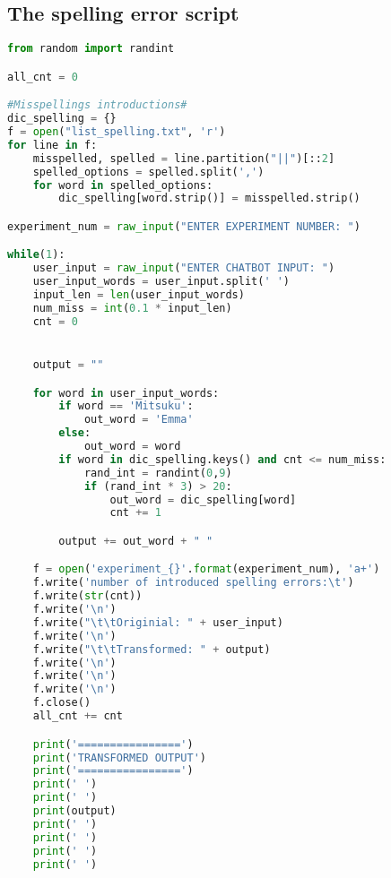 \subsection{The spelling error script}

\begin{lstlisting}[language=Python]
from random import randint

all_cnt = 0

#Misspellings introductions#
dic_spelling = {}
f = open("list_spelling.txt", 'r')
for line in f:
	misspelled, spelled = line.partition("||")[::2]
	spelled_options = spelled.split(',')
	for word in spelled_options:
		dic_spelling[word.strip()] = misspelled.strip()

experiment_num = raw_input("ENTER EXPERIMENT NUMBER: ")

while(1):
	user_input = raw_input("ENTER CHATBOT INPUT: ")
	user_input_words = user_input.split(' ')
	input_len = len(user_input_words)
	num_miss = int(0.1 * input_len)
	cnt = 0


	output = ""

	for word in user_input_words:
		if word == 'Mitsuku':
			out_word = 'Emma'
		else:
			out_word = word
		if word in dic_spelling.keys() and cnt <= num_miss:
			rand_int = randint(0,9)
			if (rand_int * 3) > 20:
				out_word = dic_spelling[word]
				cnt += 1

		output += out_word + " "

	f = open('experiment_{}'.format(experiment_num), 'a+')
	f.write('number of introduced spelling errors:\t')
	f.write(str(cnt))
	f.write('\n')
	f.write("\t\tOriginial: " + user_input)
	f.write('\n')
	f.write("\t\tTransformed: " + output)
	f.write('\n')
	f.write('\n')
	f.write('\n')
	f.close()
	all_cnt += cnt

	print('================')
	print('TRANSFORMED OUTPUT')
	print('================')
	print(' ')
	print(' ')
	print(output)
	print(' ')
	print(' ')
	print(' ')
	print(' ')
\end{lstlisting}
